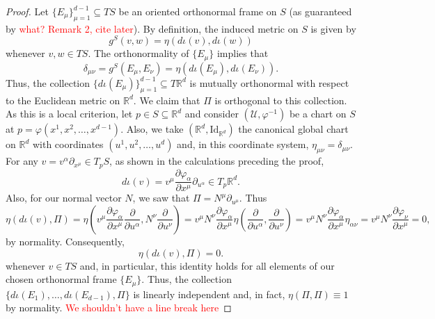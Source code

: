 \documentclass{article}
\theoremstyle{definition}
\newcommand{\p}{\partial}
\newcommand{\R}{\mathbb{R}}
\newcommand{\al}{\alpha}
\newcommand{\f}[2]{\frac{#1}{#2}}
\newcommand{\lp}{\left(}
\newcommand{\rp}{\right)}
\theoremstyle{theorem}
\begin{document}
\begin{proof}
Let $\{ E_\mu \}_{\mu = 1}^{d-1}\subseteq TS$ be an oriented orthonormal frame on $S$ (as guaranteed by \textcolor{red}{what? Remark 2, cite later}). By definition, the induced metric on $S$ is given by 
\begin{equation*}
    g^S(v,w) = \eta(d\iota (v), d\iota(w))
\end{equation*}
whenever $v,w\in TS$. The orthonormality of $\{E_\mu\}$ implies that 
\begin{equation*}
    \delta_{\mu\nu} = g^S(E_\mu,E_\nu) = \eta(d\iota(E_\mu), d\iota(E_\nu)).
\end{equation*}
Thus, the collection $\{ d\iota(E_\mu) \}_{\mu = 1}^{d-1}\subseteq T\R^d$ is mutually orthonormal with respect to the Euclidean metric on $\mathbb{R}^d$. We claim that $\Pi$ is orthogonal to this collection. As this is a local criterion, let $p\in S\subseteq\mathbb{R}^d$ and consider $(\mathcal{U},\varphi^{-1})$ be a chart on $S$ at $p=\varphi(x^1,x^2,\dots,x^{d-1})$. Also, we take $(\mathbb{R}^d,\mbox{Id}_{\mathbb{R}^d})$ the canonical global chart on $\mathbb{R}^d$ with coordinates $(u^1,u^2,\dots,u^d)$ and, in this coordinate system, $\eta_{\mu\nu}=\delta_{\mu\nu}$. For any $v=v^\alpha\partial_{x^{\mu}}\in T_pS$, as shown in the calculations preceding the proof,
\begin{equation*}
d\iota(v)=v^{\mu}\frac{\partial\varphi_\al}{\partial x^\mu}\partial_{u^{\al}}\in T_p\mathbb{R}^d.
\end{equation*}
Also, for our normal vector $N$, we saw that $\Pi=N^{\mu}\partial_{u^\mu}$. Thus
\begin{equation*}
    \eta(d\iota(v) , \Pi) = \eta\lp v^\mu\f{\p \varphi_\al }{ \p x^\mu} \f{\p}{\p u^\al}, N^\nu \f{\p}{\p u^\nu} \rp =  v^\mu N^\nu \f{\p \varphi_\al }{ \p x^\mu} \eta\lp \f{\p}{\p u^\alpha}, \f{\p}{\p u^\nu} \rp
    = v^\mu N^\nu \f{\p \varphi_\al }{ \p x^\mu} \eta_{\alpha\nu} = v^\mu N^\nu \f{\p \varphi_\nu }{ \p x^\mu} = 0,
\end{equation*}
by normality. Consequently,
\begin{equation*}
    \eta(d\iota(v), \Pi) = 0.
\end{equation*}
whenever $v\in TS$ and, in particular, this identity holds for all elements of our chosen orthonormal frame $\{E_\mu\}$. Thus, the collection $\{ d\iota(E_1),\dots,d\iota(E_{d-1}),\Pi\}$ is linearly independent and, in fact, $\eta(\Pi,\Pi)\equiv 1$ by normality. \textcolor{red}{We shouldn't have a line break here}

\end{proof}
\end{document}

